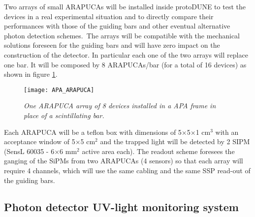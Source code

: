Two arrays of small ARAPUCAs will be installed inside protoDUNE to test the devices in a real experimental situation and to directly compare their performances with those of the guiding 
bars and other eventual alternative photon detection schemes.\
The arrays will be compatible with the mechanical solutions foreseen for the guiding bars and will have zero impact on the construction of the detector. In particular each one of the two 
arrays will replace one bar. It will be composed by 8 ARAPUCAs/bar (for a total of 16 devices)  as shown in figure \ref{fig:arapuca_array}.
\begin{figure}[t]
\begin{center}
\texttt{[image: APA\_ARAPUCA]}
\caption{ {\it One ARAPUCA array of 8 devices installed in a APA frame in place of a scintillating bar.}}
\label{fig:arapuca_array}
\end{center}
\end{figure}
Each ARAPUCA will be a teflon box with dimensions of 5$\times$5$\times$1 cm$^3$ with an acceptance window of 5$\times$5 
cm$^2$ and the trapped light will be detected by 2 SIPM (SensL 60035 - 6$\times$6 mm$^2$ active area each). The readout scheme foresees the ganging of the SiPMs from two ARAPUCAs (4 sensors) so that each array will require 4 channels, which will use the same cabling and the same SSP read-out of the guiding bars.

\subsection{Photon detector UV-light monitoring system}
\label{sec_pd_calib}


